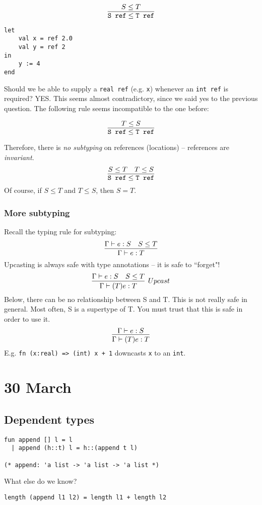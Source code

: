 \documentclass[11pt]{article}
\begin{document}
\[
    \infer{\verb~S ref~ \leq \verb~T ref~}{ S \leq T }
\]

\begin{verbatim}
let
    val x = ref 2.0
    val y = ref 2
in
    y := 4 
end
\end{verbatim}

Should we be able to supply a \verb~real ref~ (e.g. \verb~x~) whenever an \verb~int ref~ is required? YES. This seems almost contradictory, since we said yes to the previous question. The following rule seems incompatible to the one before:

\[
    \infer{\verb~S ref~ \leq \verb~T ref~}{T \leq S}
\]

Therefore, there is \emph{no subtyping} on references (locations) -- references are \emph{invariant}.
\[
    \infer{\verb~S ref~ \leq \verb~T ref~}{
        S \leq T
        &
        T \leq S
    }
\]
Of course, if $S \leq T$ and $T \leq S$, then $S = T$.

\subsubsection{More subtyping}
Recall the typing rule for subtyping:
\[
    \infer{\Gamma \vdash e : T}{
        \Gamma \vdash e : S
        &
        S \leq T
    }
\] 
Upcasting is always safe with type annotations -- it is safe to ``forget"!
\[
    \infer[Upcast]{\Gamma \vdash (T) e : T}{
        \Gamma \vdash e : S
        &
        S \leq T
     }
\]
Below, there can be no relationship between S and T. This is not really safe in general. Most often, S is a supertype of T. You must trust that this is safe in order to use it.
\[
    \infer{\Gamma \vdash (T) e : T}{ \Gamma \vdash e : S}
\]
E.g. \verb~fn (x:real) => (int) x + 1~ downcasts \verb~x~ to an \verb~int~.

\section{30 March}
\subsection{Dependent types}
\begin{verbatim}
fun append [] l = l
  | append (h::t) l = h::(append t l)

(* append: 'a list -> 'a list -> 'a list *)
\end{verbatim}
What else do we know?

\begin{verbatim}
length (append l1 l2) = length l1 + length l2
\end{verbatim}
\end{document}
